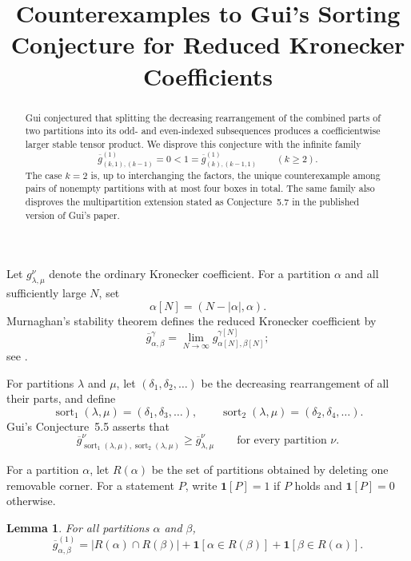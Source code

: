 \documentclass[11pt]{amsart}
\title[Gui's sorting conjecture]
{Counterexamples to Gui's Sorting Conjecture for Reduced Kronecker Coefficients}
\date{}
\newtheorem{lemma}[theorem]{Lemma}
\newcommand{\sort}{\operatorname{sort}}
\begin{document}
\begin{abstract}
Gui conjectured that splitting the decreasing rearrangement of the combined
parts of two partitions into its odd- and even-indexed subsequences produces a
coefficientwise larger stable tensor product.  We disprove this conjecture with
the infinite family
\[
  \overline g_{(k,1),(k-1)}^{(1)}=0<1=
  \overline g_{(k),(k-1,1)}^{(1)}
  \qquad(k\ge2).
\]
The case $k=2$ is, up to interchanging the factors, the unique counterexample
among pairs of nonempty partitions with at most four boxes in total.  The same
family also disproves the multipartition extension stated as Conjecture~5.7 in
the published version of Gui's paper.
\end{abstract}

\maketitle

Let $g_{\lambda,\mu}^{\nu}$ denote the ordinary Kronecker coefficient.  For a
partition $\alpha$ and all sufficiently large $N$, set
\[
  \alpha[N]=(N-|\alpha|,\alpha).
\]
Murnaghan's stability theorem defines the reduced Kronecker coefficient by
\[
  \overline g_{\alpha,\beta}^{\gamma}
  =\lim_{N\to\infty}g_{\alpha[N],\beta[N]}^{\gamma[N]};
\]
see \cite{Murnaghan}.

For partitions $\lambda$ and $\mu$, let
$(\delta_1,\delta_2,\ldots)$ be the decreasing rearrangement of all their
parts, and define
\[
  \sort_1(\lambda,\mu)=(\delta_1,\delta_3,\ldots),
  \qquad
  \sort_2(\lambda,\mu)=(\delta_2,\delta_4,\ldots).
\]
Gui's Conjecture~5.5 \cite{Gui} asserts that
\begin{equation}\label{eq:gui}
  \overline g_{\sort_1(\lambda,\mu),\sort_2(\lambda,\mu)}^{\nu}
  \ge \overline g_{\lambda,\mu}^{\nu}
  \qquad\text{for every partition }\nu.
\end{equation}

For a partition $\alpha$, let $R(\alpha)$ be the set of partitions obtained by
deleting one removable corner.  For a statement $P$, write $\mathbf 1[P]=1$
if $P$ holds and $\mathbf 1[P]=0$ otherwise.

\begin{lemma}\label{lem:one}
For all partitions $\alpha$ and $\beta$,
\[
  \overline g_{\alpha,\beta}^{(1)}
  =|R(\alpha)\cap R(\beta)|
   +\mathbf 1[\alpha\in R(\beta)]
   +\mathbf 1[\beta\in R(\alpha)].
\]
\end{lemma}
\end{document}
